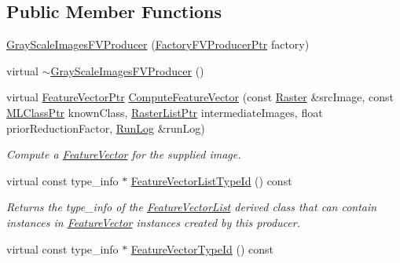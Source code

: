 \subsection*{Public Member Functions}
\begin{DoxyCompactItemize}
\item 
\hyperlink{class_k_k_m_l_l_1_1_gray_scale_images_f_v_producer_ab2d517051827c2ff83737d15e3bf0708}{Gray\+Scale\+Images\+F\+V\+Producer} (\hyperlink{namespace_k_k_m_l_l_a82812d1feb85a6cff72d059bc67bb90e}{Factory\+F\+V\+Producer\+Ptr} factory)
\item 
virtual \hyperlink{class_k_k_m_l_l_1_1_gray_scale_images_f_v_producer_a8fa33ccdf275a1c25319ad159fff4737}{$\sim$\+Gray\+Scale\+Images\+F\+V\+Producer} ()
\item 
virtual \hyperlink{namespace_k_k_m_l_l_a0c5df3d48f45926fbc4fee04f5e3bc04}{Feature\+Vector\+Ptr} \hyperlink{class_k_k_m_l_l_1_1_gray_scale_images_f_v_producer_a8e8b7ed5663e7fe6a61b134dbc5ea8d7}{Compute\+Feature\+Vector} (const \hyperlink{class_k_k_b_1_1_raster}{Raster} \&src\+Image, const \hyperlink{namespace_k_k_m_l_l_ac272393853d59e72e8456f14cd6d8c23}{M\+L\+Class\+Ptr} known\+Class, \hyperlink{namespace_k_k_b_a5369c086484e7d77bcb87b0b8aa7193d}{Raster\+List\+Ptr} intermediate\+Images, float prior\+Reduction\+Factor, \hyperlink{class_k_k_b_1_1_run_log}{Run\+Log} \&run\+Log)
\begin{DoxyCompactList}\small\item\em Compute a \hyperlink{class_k_k_m_l_l_1_1_feature_vector}{Feature\+Vector} for the supplied \textquotesingle{}image\textquotesingle{}. \end{DoxyCompactList}\item 
virtual const type\+\_\+info $\ast$ \hyperlink{class_k_k_m_l_l_1_1_gray_scale_images_f_v_producer_a5819ed8e535aac119991691c4c0aeb4b}{Feature\+Vector\+List\+Type\+Id} () const 
\begin{DoxyCompactList}\small\item\em Returns the \textquotesingle{}type\+\_\+info\textquotesingle{} of the \hyperlink{class_k_k_m_l_l_1_1_feature_vector_list}{Feature\+Vector\+List} derived class that can contain instances in \textquotesingle{}\hyperlink{class_k_k_m_l_l_1_1_feature_vector}{Feature\+Vector}\textquotesingle{} instances created by this producer. \end{DoxyCompactList}\item 
virtual const type\+\_\+info $\ast$ \hyperlink{class_k_k_m_l_l_1_1_gray_scale_images_f_v_producer_a5e6c2f87ddbfc5fcb048b3337f35f609}{Feature\+Vector\+Type\+Id} () const 

\end{DoxyCompactItemize}
